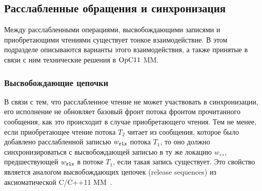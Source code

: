 \subsection{Расслабленные обращения и синхронизация}
Между расслабленными операциями, высвобождающими записями и
приобретающими чтениями существует тонкое взаимодействие.
В этом подразделе описываются варианты этого взаимодействия, а также
принятые в связи с ним технические решения в $\mathrm{OpC11}$ MM.

\subsubsection{Высвобождающие цепочки}
\label{sec:opc11:releaseseq}
В связи с тем, что расслабленное чтение не может участвовать в синхронизации,
его исполнение не обновляет базовый фронт потока фронтом прочитанного сообщения,
как это происходит в случае приобретающего чтения.
Тем не менее, если приобретающее чтение потока $T_2$ читает из сообщения, которое
было добавлено расслабленной записью $w_{\mathtt{rlx}}$ потока $T_1$, то оно должно синхронизироваться
с высвобождающей записью в ту же локацию $w_{\rel}$, предшествующей $w_{\mathtt{rlx}}$ в потоке $T_1$,
если такая запись существует.
Это свойство является аналогом высвобождающих цепочек (release sequences) из аксиоматической
C/C++11 MM~\cite{Batty-al:POPL11}.

